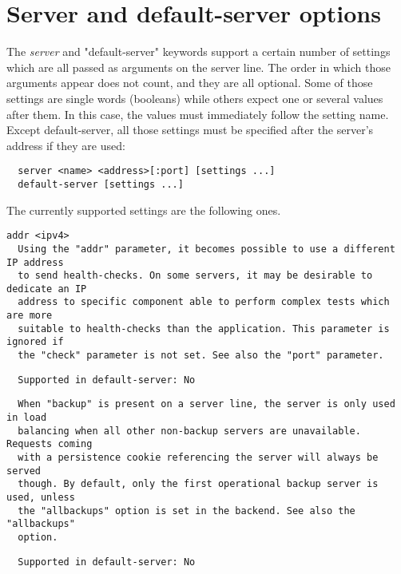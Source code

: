 
\chapter{Server and default-server options}

The \emph{server} and "default-server" keywords support a certain number of settings
which are all passed as arguments on the server line. The order in which those
arguments appear does not count, and they are all optional. Some of those
settings are single words (booleans) while others expect one or several values
after them. In this case, the values must immediately follow the setting name.
Except default-server, all those settings must be specified after the server's
address if they are used:

\begin{verbatim}
  server <name> <address>[:port] [settings ...]
  default-server [settings ...]
\end{verbatim}


The currently supported settings are the following ones.

\begin{verbatim}
addr <ipv4>
  Using the "addr" parameter, it becomes possible to use a different IP address
  to send health-checks. On some servers, it may be desirable to dedicate an IP
  address to specific component able to perform complex tests which are more
  suitable to health-checks than the application. This parameter is ignored if
  the "check" parameter is not set. See also the "port" parameter.
\end{verbatim}

\begin{verbatim}
  Supported in default-server: No
\end{verbatim}

\begin{verbatim}
  When "backup" is present on a server line, the server is only used in load
  balancing when all other non-backup servers are unavailable. Requests coming
  with a persistence cookie referencing the server will always be served
  though. By default, only the first operational backup server is used, unless
  the "allbackups" option is set in the backend. See also the "allbackups"
  option.
\end{verbatim}

\begin{verbatim}
  Supported in default-server: No
\end{verbatim}

